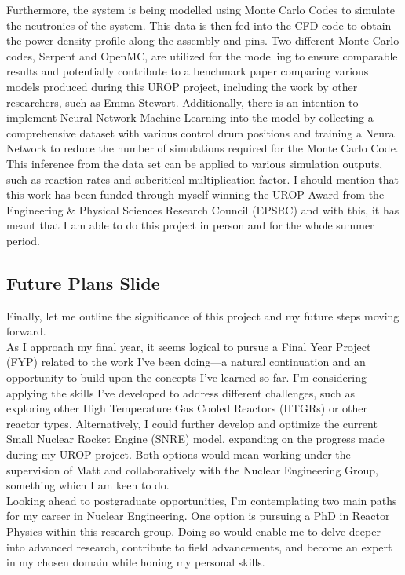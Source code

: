 \documentclass[8pt,a5paper]{article}
\begin{document}
Furthermore, the system is being modelled using Monte Carlo Codes to simulate the neutronics of the system. This data is then fed into the CFD-code to obtain the power density profile along the assembly and pins. Two different Monte Carlo codes, Serpent and OpenMC, are utilized for the modelling to ensure comparable results and potentially contribute to a benchmark paper comparing various models produced during this UROP project, including the work by other researchers, such as Emma Stewart. Additionally, there is an intention to implement Neural Network Machine Learning into the model by collecting a comprehensive dataset with various control drum positions and training a Neural Network to reduce the number of simulations required for the Monte Carlo Code. This inference from the data set can be applied to various simulation outputs, such as reaction rates and subcritical multiplication factor.
I should mention that this work has been funded through myself winning the UROP Award from the Engineering \& Physical Sciences Research Council (EPSRC) and with this, it has meant that I am able to do this project in person and for the whole summer period.

\subsection*{Future Plans Slide}

Finally, let me outline the significance of this project and my future steps moving forward.\\

As I approach my final year, it seems logical to pursue a Final Year Project (FYP) related to the work I've been doing—a natural continuation and an opportunity to build upon the concepts I've learned so far. I'm considering applying the skills I've developed to address different challenges, such as exploring other High Temperature Gas Cooled Reactors (HTGRs) or other reactor types. Alternatively, I could further develop and optimize the current Small Nuclear Rocket Engine (SNRE) model, expanding on the progress made during my UROP project. Both options would mean working under the supervision of Matt and collaboratively with the Nuclear Engineering Group, something which I am keen to do. \\

Looking ahead to postgraduate opportunities, I'm contemplating two main paths for my career in Nuclear Engineering. One option is pursuing a PhD in Reactor Physics within this research group. Doing so would enable me to delve deeper into advanced research, contribute to field advancements, and become an expert in my chosen domain while honing my personal skills.\\
\end{document}
